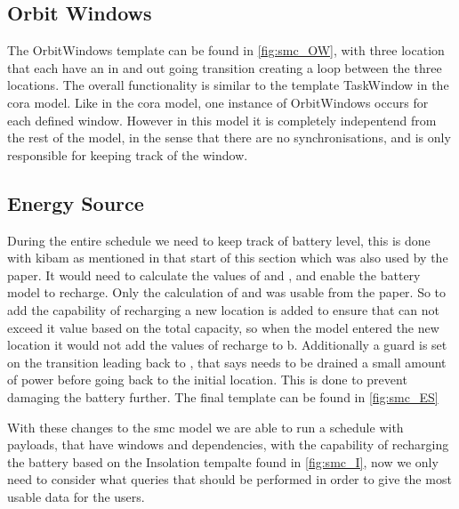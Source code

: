 \subsection*{Orbit Windows}
The OrbitWindows template can be found in \cref{fig:smc_OW}, with three location that each have an in and out going transition creating a loop between the three locations. The overall functionality is similar to the template TaskWindow in the \gls{cora} model. Like in the \gls{cora} model, one instance of OrbitWindows occurs for each defined window. However in this model it is completely indepentend from the rest of the model, in the sense that there are no synchronisations, and is only responsible for keeping track of the window.

\subsection*{Energy Source}
During the entire schedule we need to keep track of battery level, this is done with \gls{kibam} as mentioned in that start of this section which was also used by the paper. It would need to calculate the values of  and , and enable the battery model to recharge. Only the calculation of  and  was usable from the paper. So to add the capability of recharging a new location is added to ensure that  can not exceed it value based on the total capacity, so when the model entered the new location it would not add the values of recharge to b. Additionally a guard is set on the transition leading back to , that says  needs to be drained a small amount of power before going back to the initial location. This is done to prevent damaging the battery further. The final template can be found in \cref{fig:smc_ES}

With these changes to the \gls{smc} model we are able to run a schedule with payloads, that have windows and dependencies, with the capability of recharging the battery based on the Insolation tempalte found in \cref{fig:smc_I}, now we only need to consider what queries that should be performed in order to give the most usable data for the users.


